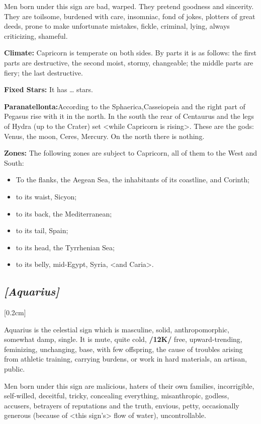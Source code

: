 Men born under this sign are bad, warped. They pretend goodness and sincerity. They are toilsome, burdened with care, insomniac, fond of jokes, plotters of great deeds, prone to make unfortunate mistakes, fickle, criminal, lying, always criticizing, shameful.

\textbf{Climate:} Capricorn is temperate on both sides. By parts it is as follows: the first parts are destructive, the
second moist, stormy, changeable; the middle parts are fiery; the last destructive. 

\textbf{Fixed Stars:} It has … stars.

\textbf{Paranatellonta:}According to the Sphaerica,Casseiopeia and the right part of Pegasus rise with it in the north. In the south the rear of Centaurus and the legs of Hydra (up to the Crater) set <while Capricorn is rising>. These are the gods: Venus, the moon, Ceres, Mercury. On the north there is nothing.

\textbf{Zones:} The following zones are subject to Capricorn, all of them to the West and South: 
\begin{itemize}
\item To the flanks, the Aegean Sea, the inhabitants of its coastline, and Corinth; 
\item to its waist, Sicyon; 
\item to its back, the Mediterranean; 
\item to its tail, Spain; 
\item to its head, the Tyrrhenian Sea; 
\item to its belly, mid-Egypt, Syria, <and Caria>.
\end{itemize}

\secbr
\subsection{\textit{[Aquarius]}}
[0.2cm]

 Aquarius is the celestial sign which is  masculine,  solid,  anthropomorphic, somewhat damp, single. It is  mute, quite cold, \textbf{/12K/} free, upward-trending, feminizing, unchanging, base, with few offspring, the cause of troubles arising from athletic training, carrying burdens, or work in hard materials, an artisan, public. 

Men born under this sign are malicious, haters of their own families, incorrigible, self-willed, deceitful, tricky, concealing everything, misanthropic, godless, accusers, betrayers of reputations and the truth, envious, petty, occasionally generous (because of <this sign’s> flow of water), uncontrollable.

